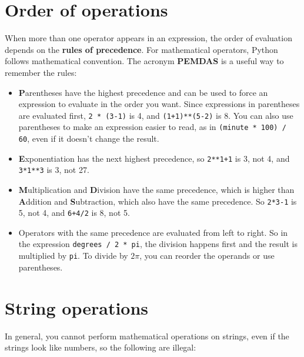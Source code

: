 \documentclass[10pt]{book}
\begin{document}
\section{Order of operations}

When more than one operator appears in an expression, the order of
evaluation depends on the {\bf rules of precedence}.  For
mathematical operators, Python follows mathematical convention.
The acronym {\bf PEMDAS} is a useful way to
remember the rules:


\begin{itemize}

\item {\bf P}arentheses have the highest precedence and can be used 
to force an expression to evaluate in the order you want. Since
expressions in parentheses are evaluated first, {\tt 2 * (3-1)} is 4,
and {\tt (1+1)**(5-2)} is 8. You can also use parentheses to make an
expression easier to read, as in {\tt (minute * 100) / 60}, even
if it doesn't change the result.

\item {\bf E}xponentiation has the next highest precedence, so
{\tt 2**1+1} is 3, not 4, and {\tt 3*1**3} is 3, not 27.

\item {\bf M}ultiplication and {\bf D}ivision have the same precedence,
which is higher than {\bf A}ddition and {\bf S}ubtraction, which also
have the same precedence.  So {\tt 2*3-1} is 5, not 4, and
{\tt 6+4/2} is 8, not 5.

\item Operators with the same precedence are evaluated from left to 
right.  So in the expression {\tt degrees / 2 * pi}, the division
happens first and the result is multiplied by {\tt pi}.  
To divide by $2 \pi$, you can reorder the operands or use parentheses.

\end{itemize}


\section{String operations}

In general, you cannot perform mathematical operations on strings, even
if the strings look like numbers, so the following are illegal:
\end{document}
